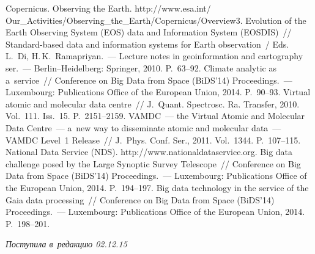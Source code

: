 \begin{multicols}{2}
{{\begin{thebibliography}{99}
Copernicus. Observing the Earth. {\sf 
http://www.esa.int/ Our\_Activities/Observing\_the\_Earth/Copernicus/\linebreak Overview3}.
 Evolution of the Earth 
Observing System (EOS) data and Information System (EOSDIS)~// Standard-based data and information 
systems for Earth observation~/ Eds. L.~Di, H.\,K.~Ramapriyan.~--- Lecture notes in geoinformation and 
cartography ser.~--- Berlin--Heidelberg: Springer, 2010. P.~63--92.
 Climate analytic as a~service~// 
Conference on Big Data from Space (BiDS'14) Proceedings.~--- Luxembourg: Publications Office of the 
European Union, 2014. P.~90--93.
 Virtual atomic and molecular data 
centre~// J.~Quant. Spectrosc. Ra. Transfer, 2010. Vol.~111. Iss.~15. P.~2151--2159.
 VAMDC~--- the Virtual Atomic and 
Molecular Data Centre~--- a~new way to disseminate atomic and molecular data~--- VAMDC Level~1 
Release~// J.~Phys. Conf. Ser., 2011. Vol.~1344. P.~107--115.
National Data Service (NDS). {\sf http://www.\linebreak nationaldataservice.org}.
 Big data challenge posed by the Large Synoptic Survey Telescope~//  Conference on Big 
Data from Space (BiDS'14) Proceedings.~--- Luxembourg: Publications Office of the European Union, 
2014. P.~194--197.
 Big data technology in the service of the Gaia data processing~//  
Conference on Big Data from Space (BiDS'14) Proceedings.~--- Luxembourg: Publications Office of the 
European Union, 2014. P.~198--201.
\end{thebibliography}

 }
 }

\end{multicols}

\vspace*{-3pt}

\hfill{\small\textit{Поступила в~редакцию 02.12.15}}

\vspace*{8pt}



